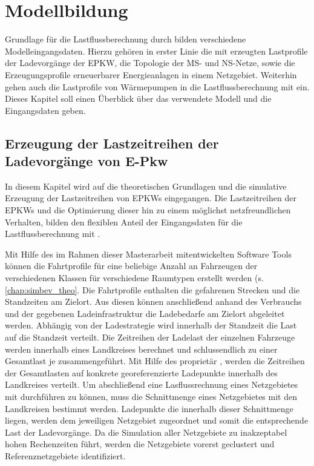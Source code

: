 
\section{Modellbildung}

Grundlage für die Lastflussberechnung durch \edisgo bilden verschiedene Modelleingangsdaten.
Hierzu gehören in erster Linie die mit \simbev erzeugten Lastprofile der Ladevorgänge der \gls{EPKW}, die Topologie der \gls{MS}- und \gls{NS}-Netze, sowie die Erzeugungsprofile erneuerbarer Energieanlagen in einem Netzgebiet.
Weiterhin gehen auch die Lastprofile von Wärmepumpen in die Lastflussberechnung mit ein.
Dieses Kapitel soll einen Überblick über das verwendete Modell und die Eingangsdaten geben.\medskip


\subsection{Erzeugung der Lastzeitreihen der Ladevorgänge von E-Pkw}


In diesem Kapitel wird auf die theoretischen Grundlagen und die simulative Erzeugung der Lastzeitreihen von \glspl{EPKW} eingegangen.
Die Lastzeitreihen der \glspl{EPKW} und die Optimierung dieser hin zu einem möglichst netzfreundlichen Verhalten, bilden den flexiblen Anteil der Eingangsdaten für die Lastflussberechnung mit \edisgo.\medskip

Mit Hilfe des im Rahmen dieser Masterarbeit mitentwickelten Software Tools \simbev können die Fahrtprofile für eine beliebige Anzahl an Fahrzeugen der verschiedenen Klassen für verschiedene Raumtypen erstellt werden (s. \autoref{chap:simbev_theo}.
Die Fahrtprofile enthalten die gefahrenen Strecken und die Standzeiten am Zielort.
Aus diesen können anschließend anhand des Verbrauchs und der gegebenen Ladeinfrastruktur die Ladebedarfe am Zielort abgeleitet werden.
Abhängig von der Ladestrategie wird innerhalb der Standzeit die Last auf die Standzeit verteilt.
Die Zeitreihen der Ladelast der einzelnen Fahrzeuge werden innerhalb eines Landkreises berechnet und schlussendlich zu einer Gesamtlast je \UC zusammengeführt.
Mit Hilfe des proprietär \localiserToolsKomma , werden die Zeitreihen der Gesamtlasten auf konkrete georeferenzierte Ladepunkte innerhalb des Landkreises verteilt.
Um abschließend eine Lasflussrechnung eines Netzgebietes mit \edisgo durchführen zu können, muss die Schnittmenge eines Netzgebietes mit den Landkreisen bestimmt werden.
Ladepunkte die innerhalb dieser Schnittmenge liegen, werden dem jeweiligen Netzgebiet zugeordnet und somit die entsprechende Last der Ladevorgänge.
Da die Simulation aller Netzgebiete zu inakzeptabel hohen Rechenzeiten führt, werden die \dingo Netzgebiete vorerst geclustert und Referenznetzgebiete identifiziert.


